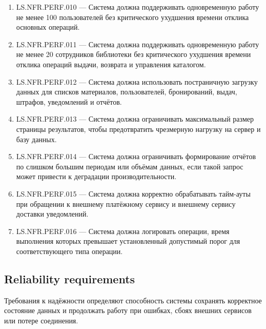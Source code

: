 \documentclass[12pt,a4paper]{article}
\begin{document}
\begin{enumerate}
		\item LS.NFR.PERF.010 --- Система должна поддерживать одновременную работу
		не менее 100 пользователей без критического ухудшения времени отклика основных
		операций.
		
		\item LS.NFR.PERF.011 --- Система должна поддерживать одновременную работу
		не менее 20 сотрудников библиотеки без критического ухудшения времени отклика
		операций выдачи, возврата и управления каталогом.
		
		\item LS.NFR.PERF.012 --- Система должна использовать постраничную загрузку
		данных для списков материалов, пользователей, бронирований, выдач, штрафов,
		уведомлений и отчётов.
		
		\item LS.NFR.PERF.013 --- Система должна ограничивать максимальный размер
		страницы результатов, чтобы предотвратить чрезмерную нагрузку на сервер
		и базу данных.
		
		\item LS.NFR.PERF.014 --- Система должна ограничивать формирование отчётов
		по слишком большим периодам или объёмам данных, если такой запрос может
		привести к деградации производительности.
		
		\item LS.NFR.PERF.015 --- Система должна корректно обрабатывать тайм-ауты
		при обращении к внешнему платёжному сервису и внешнему сервису доставки
		уведомлений.
		
		\item LS.NFR.PERF.016 --- Система должна логировать операции, время выполнения
		которых превышает установленный допустимый порог для соответствующего типа
		операции.
	\end{enumerate}
	
	\subsection{Reliability requirements}
	
	Требования к надёжности определяют способность системы сохранять корректное
	состояние данных и продолжать работу при ошибках, сбоях внешних сервисов
	или потере соединения.
	
\end{document}
